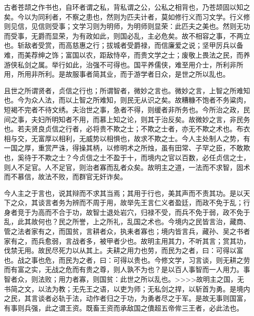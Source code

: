 \documentclass[]{article}
\begin{document}
古者苍颉之作书也，自环者谓之私，背私谓之公，公私之相背也，乃苍颉固以知之矣。今以为同利者，不察之患也，然则为匹夫计者，莫如修行义而习文学。行义修则见信，见信则受事；文学习则为明师，为明师则显荣：此匹夫之美也。然则无功而受事，无爵而显荣，为有政如此，则国必乱，主必危矣。故不相容之事，不两立也。斩敌者受赏，而高慈惠之行；拔城者受爵禄，而信廉爱之说；坚甲厉兵以备难，而美荐绅之饰；富国以农，距敌恃卒，而贵文学之士；废敬上畏法之民，而养游侠私剑之属。举行如此，治强不可得也。国平养儒侠，难至用介士，所利非所用，所用非所利。是故服事者简其业，而于游学者日众，是世之所以乱也。

且世之所谓贤者，贞信之行也；所谓智者，微妙之言也。微妙之言，上智之所难知也。今为众人法，而以上智之所难知，则民无从识之矣。故糟糠不饱者不务粱肉，短褐不完者不待文绣。夫治世之事，急者不得，则缓者非所务也。今所治之政，民间之事，夫妇所明知者不用，而慕上知之论，则其于治反矣。故微妙之言，非民务也。若夫贤良贞信之行者，必将贵不欺之士；不欺之士者，亦无不欺之术也。布衣相与交，无富厚以相利，无威势以相惧也，故求不欺之士。今人主处制人之势，有一国之厚，重赏严诛，得操其柄，以修明术之所烛，虽有田常、子罕之臣，不敢欺也，奚待于不欺之士？今贞信之士不盈于十，而境内之官以百数，必任贞信之士，则人不足官。人不足官，则治者寡而乱者众矣。故明主之道，一法而不求智，固术而不慕信，故法不败，而群官无奸诈矣。

今人主之于言也，说其辩而不求其当焉；其用于行也，美其声而不责其功。是以天下之众，其谈言者务为辨而不周于用，故举先王言仁义者盈廷，而政不免于乱；行身者竞于为高而不合于功，故智士退处岩穴，归禄不受，而兵不免于弱，政不免于乱，此其故何也？民之所誉，上之所礼，乱国之术也。今境内之民皆言治，藏商、管之法者家有之，而国贫，言耕者众，执耒者寡也；境内皆言兵，藏孙、吴之书者家有之，而兵愈弱，言战者多，被甲者少也。故明主用其力，不听其言；赏其功，伐禁无用。故民尽死力以从其上。夫耕之用力也劳，而民为之者，曰：可得以富也。战之事也危，而民为之者，曰：可得以贵也。今修文学，习言谈，则无耕之劳而有富之实，无战之危而有贵之尊，则人孰不为也？是以百人事智而一人用力。事智者众，则法败；用力者寡，则国贫：此世之所以乱也。\textgreater{}\textgreater{}\textgreater{}\textgreater{}故明主之国，无书简之文，以法为教；无先王之语，以吏为师；无私剑之捍，以斩首为勇。是境内之民，其言谈者必轨于法，动作者归之于功，为勇者尽之于军。是故无事则国富，有事则兵强，此之谓王资。既畜王资而承敌国之儥超五帝侔三王者，必此法也。
\end{document}
